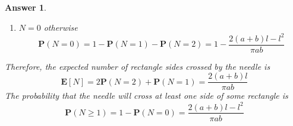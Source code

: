 \documentclass[utf8]{article}
\theoremstyle{definition}%
\theoremstyle{plain}%
\newtheorem{answer}{Answer} %
\begin{document}
\begin{answer}
\begin{enumerate}[label=(\alph*)]
        \begin{equation}
        \begin{aligned}
            \mathbf{P}(N = 1) &= \int_{0}^{\pi}\int_{0}^{b/2}\int_{0}^{\mid l\sin\theta \mid/2} \frac{4 \dd{x}\dd{y}\dd{\theta}}{\pi a b} + \int_{0}^{\pi}\int_{0}^{\mid l\cos\theta \mid/2}\int_{0}^{a/2} \frac{4 \dd{x}\dd{y}\dd{\theta}}{\pi a b} - 2\mathbf{P}(N = 2) \\
            &= \frac{2l}{\pi a} + \frac{2l}{\pi b} - \frac{l^2}{\pi ab} = \frac{2(a+b)l - 2l^2}{\pi ab}
        \end{aligned}
        \end{equation}
        \item $N = 0$ otherwise
        \begin{equation}
            \mathbf{P}(N = 0) = 1 - \mathbf{P}(N = 1) - \mathbf{P}(N = 2) = 1 - \frac{2(a+b)l - l^2}{\pi ab}
        \end{equation}
    \end{enumerate}
    Therefore, the expected number of rectangle sides crossed by the needle is
    \begin{equation}
        \mathbf{E}[N] = 2\mathbf{P}(N = 2) + \mathbf{P}(N = 1) = \frac{2(a+b)l}{\pi ab}
    \end{equation}
    The probability that the needle will cross at least one side of some rectangle is
    \begin{equation}
        \mathbf{P}(N \geq 1) = 1 - \mathbf{P}(N = 0) = \frac{2(a+b)l - l^2}{\pi ab}
    \end{equation}
\end{answer}
\end{document}
